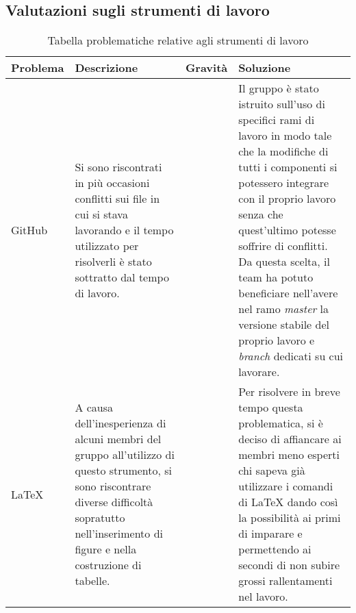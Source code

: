 \subsection{Valutazioni sugli strumenti di lavoro}
\begin{table}[H]
	
	\begin{longtable}{ >{\centering}p{} >{\centering}p{}
			>{\centering}p{} >{\centering}p{}}
			
		\hline
		\rowcolorhead
		\textbf{\color{white}Problema} 
		& \textbf{\color{white}Descrizione} 
		& \centering\textbf{\color{white}Gravità}
		& \textbf{\color{white}Soluzione} 
		\tabularnewline \hline 	
		
		GitHub & 
		Si sono riscontrati in più occasioni conflitti sui file in cui si
		stava lavorando e il tempo utilizzato per risolverli è stato sottratto dal tempo
		di lavoro. &
		2 &
		Il gruppo è stato istruito sull'uso di specifici rami di lavoro in modo tale che
		la modifiche di tutti i componenti si potessero integrare con il proprio lavoro 
		senza che quest'ultimo potesse soffrire di conflitti. Da questa scelta, il team
		ha potuto beneficiare nell'avere nel ramo \textit{master} la versione stabile 
		del proprio lavoro e \textit{branch} dedicati su cui lavorare.
						
		\tabularnewline 
		\LaTeX{} &
		A causa dell'inesperienza di alcuni membri del gruppo all'utilizzo di questo
		strumento, si sono riscontrare diverse difficoltà sopratutto nell'inserimento 
		di figure e nella costruzione di tabelle. &
		1 &
		Per risolvere in breve tempo questa problematica, si è deciso di affiancare
		ai membri meno esperti chi sapeva già utilizzare i comandi di \LaTeX{} dando
		così la possibilità ai primi di imparare e permettendo ai secondi di non 
		subire grossi rallentamenti nel lavoro.
		
			
	\end{longtable}
	\caption{Tabella problematiche relative agli strumenti di lavoro}	
\end{table}


